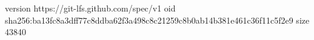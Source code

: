 version https://git-lfs.github.com/spec/v1
oid sha256:ba13fc8a3dff77c8ddba62f3a498c8c21259c8b0ab14b381e461c36f11c5f2e9
size 43840

